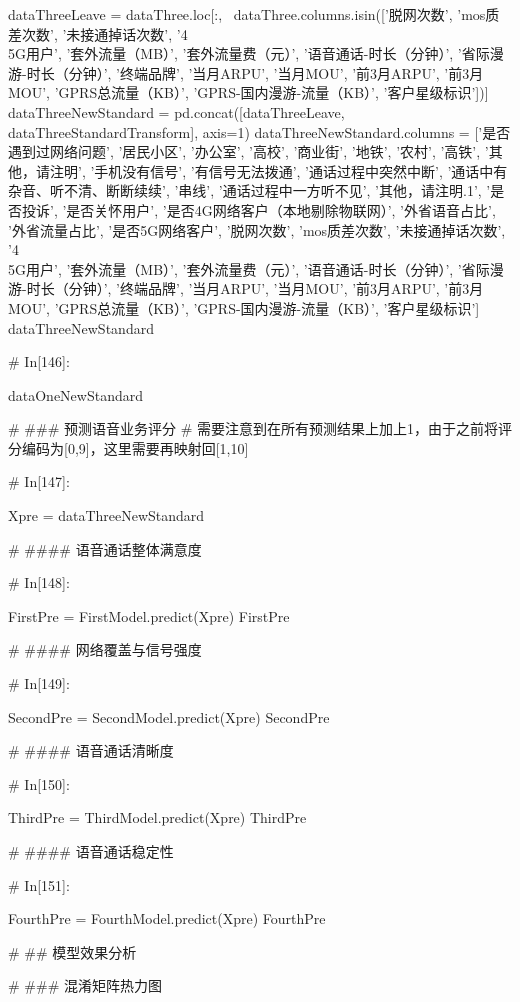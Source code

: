 \documentclass{MathorCupmodeling}
\begin{document}
\begin{python}
	
	dataThreeLeave = dataThree.loc[:, ~dataThree.columns.isin(['脱网次数', 'mos质差次数', '未接通掉话次数', '4\\5G用户', '套外流量（MB）', '套外流量费（元）', '语音通话-时长（分钟）', '省际漫游-时长（分钟）', '终端品牌', '当月ARPU', '当月MOU', '前3月ARPU', '前3月MOU', 'GPRS总流量（KB）', 'GPRS-国内漫游-流量（KB）', '客户星级标识'])]
	dataThreeNewStandard = pd.concat([dataThreeLeave, dataThreeStandardTransform], axis=1)
	dataThreeNewStandard.columns = ['是否遇到过网络问题', '居民小区', '办公室', '高校', '商业街', '地铁', '农村', '高铁', '其他，请注明', '手机没有信号', '有信号无法拨通', '通话过程中突然中断', '通话中有杂音、听不清、断断续续', '串线', '通话过程中一方听不见', '其他，请注明.1', '是否投诉', '是否关怀用户', '是否4G网络客户（本地剔除物联网）', '外省语音占比', '外省流量占比', '是否5G网络客户', '脱网次数', 'mos质差次数', '未接通掉话次数', '4\\5G用户', '套外流量（MB）', '套外流量费（元）', '语音通话-时长（分钟）', '省际漫游-时长（分钟）', '终端品牌', '当月ARPU', '当月MOU', '前3月ARPU', '前3月MOU', 'GPRS总流量（KB）', 'GPRS-国内漫游-流量（KB）', '客户星级标识']
	dataThreeNewStandard
	
	# In[146]:
	
	
	dataOneNewStandard
	
	# ### 预测语音业务评分
	# 需要注意到在所有预测结果上加上1，由于之前将评分编码为[0,9]，这里需要再映射回[1,10]
	
	# In[147]:
	
	
	Xpre = dataThreeNewStandard
	
	# #### 语音通话整体满意度
	
	# In[148]:
	
	
	FirstPre = FirstModel.predict(Xpre)
	FirstPre
	
	# #### 网络覆盖与信号强度
	
	# In[149]:
	
	
	SecondPre = SecondModel.predict(Xpre)
	SecondPre
	
	# #### 语音通话清晰度
	
	# In[150]:
	
	
	ThirdPre = ThirdModel.predict(Xpre)
	ThirdPre
	
	# #### 语音通话稳定性
	
	# In[151]:
	
	
	FourthPre = FourthModel.predict(Xpre)
	FourthPre
	
	# ## 模型效果分析
	
	# ### 混淆矩阵热力图
	

\end{python}
\end{document}
